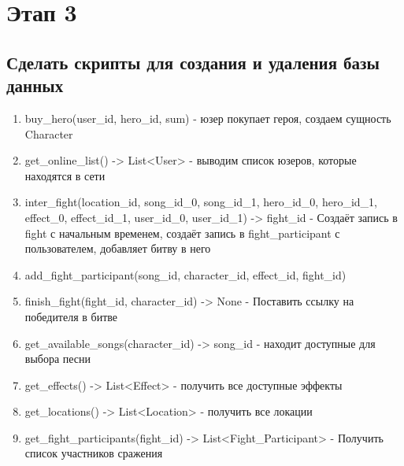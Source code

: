 \newpage

\section*{Этап 3}


\subsection*{Сделать скрипты для создания и удаления базы данных}


\begin{enumerate}
    \item buy\_hero(user\_id, hero\_id, sum) 
    - юзер покупает героя, создаем сущность Character

    \item get\_online\_list() -> List<User>
    - выводим список юзеров, которые находятся в сети

    \item inter\_fight(location\_id, song\_id\_0, song\_id\_1, hero\_id\_0, hero\_id\_1, effect\_0, effect\_id\_1, user\_id\_0, user\_id\_1) -> fight\_id
    - Создаёт запись в fight с начальным временем, создаёт запись в fight\_participant с пользователем, добавляет битву в него 

    \item add\_fight\_participant(song\_id, character\_id, effect\_id, fight\_id)

    \item finish\_fight(fight\_id, character\_id) -> None
    - Поставить ссылку на победителя в битве

    \item get\_available\_songs(character\_id) -> song\_id
    - находит доступные для выбора песни
    
    \item get\_effects() -> List<Effect>
    - получить все доступные эффекты 
    
    \item get\_locations() -> List<Location>
    - получить все локации

    \item get\_fight\_participants(fight\_id) -> List<Fight\_Participant>
    - Получить список участников сражения

    \end{enumerate}

